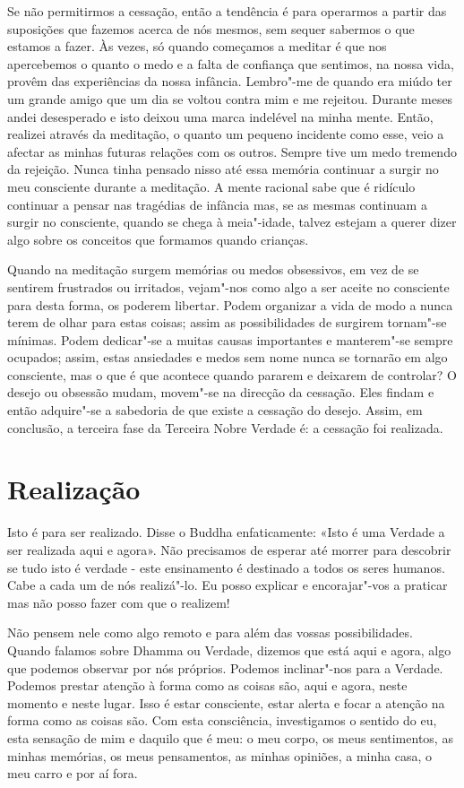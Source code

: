 Se não permitirmos a cessação, então a tendência é para operarmos a partir das
suposições que fazemos acerca de nós mesmos, sem sequer sabermos o que estamos a
fazer. Às vezes, só quando começamos a meditar é que nos apercebemos o quanto o
medo e a falta de confiança que sentimos, na nossa vida, provêm das experiências
da nossa infância. Lembro"-me de quando era miúdo ter um grande amigo que um dia
se voltou contra mim e me rejeitou. Durante meses andei desesperado e isto
deixou uma marca indelével na minha mente. Então, realizei através da meditação,
o quanto um pequeno incidente como esse, veio a afectar as minhas futuras
relações com os outros. Sempre tive um medo tremendo da rejeição. Nunca tinha
pensado nisso até essa memória continuar a surgir no meu consciente durante a
meditação. A mente racional sabe que é ridículo continuar a pensar nas tragédias
de infância mas, se as mesmas continuam a surgir no consciente, quando se chega
à meia"-idade, talvez estejam a querer dizer algo sobre os conceitos que formamos
quando crianças.

Quando na meditação surgem memórias ou medos obsessivos, em vez de se sentirem
frustrados ou irritados, vejam"-nos como algo a ser aceite no consciente para
desta forma, os poderem libertar. Podem organizar a vida de modo a nunca terem
de olhar para estas coisas; assim as possibilidades de surgirem tornam"-se
mínimas. Podem dedicar"-se a muitas causas importantes e manterem"-se sempre
ocupados; assim, estas ansiedades e medos sem nome nunca se tornarão em algo
consciente, mas o que é que acontece quando pararem e deixarem de controlar? O
desejo ou obsessão mudam, movem"-se na direcção da cessação. Eles findam e então
adquire"-se a sabedoria de que existe a cessação do desejo. Assim, em conclusão,
a terceira fase da Terceira Nobre Verdade é: a cessação foi realizada.

\section{Realização}

Isto é para ser realizado. Disse o Buddha enfaticamente: «Isto é uma Verdade a
ser realizada aqui e agora». Não precisamos de esperar até morrer para descobrir
se tudo isto é verdade - este ensinamento é destinado a todos os seres humanos.
Cabe a cada um de nós realizá"-lo. Eu posso explicar e encorajar"-vos a praticar
mas não posso fazer com que o realizem!

Não pensem nele como algo remoto e para além das vossas possibilidades. Quando
falamos sobre Dhamma ou Verdade, dizemos que está aqui e agora, algo que podemos
observar por nós próprios. Podemos inclinar"-nos para a Verdade. Podemos prestar
atenção à forma como as coisas são, aqui e agora, neste momento e neste lugar.
Isso é estar consciente, estar alerta e focar a atenção na forma como as coisas
são. Com esta consciência, investigamos o sentido do eu, esta sensação de mim
e daquilo que é meu: o meu corpo, os meus sentimentos, as minhas memórias, os
meus pensamentos, as minhas opiniões, a minha casa, o meu carro e por aí fora.

